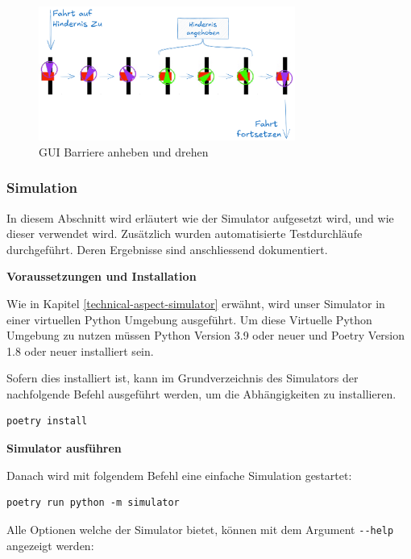 \begin{figure}[H]
\centering
\includegraphics[width=0.75\textwidth]{assets/informatik-prototyp/simulator/sim-ui-barrier-flow.png}
\caption{GUI Barriere anheben und drehen}
\label{fig:sim-gui-barrier-flow}
\end{figure}



\subsubsection{Simulation}

In diesem Abschnitt wird erläutert wie der Simulator aufgesetzt wird, und wie dieser verwendet wird. Zusätzlich wurden automatisierte Testdurchläufe durchgeführt. Deren Ergebnisse sind anschliessend dokumentiert.

\textbf{Voraussetzungen und Installation}

Wie in Kapitel \ref{technical-aspect-simulator} erwähnt, wird unser Simulator in einer virtuellen Python Umgebung ausgeführt. Um diese Virtuelle Python Umgebung zu nutzen müssen Python Version 3.9 oder neuer und Poetry Version 1.8 oder neuer installiert sein.

Sofern dies installiert ist, kann im Grundverzeichnis des Simulators der nachfolgende Befehl ausgeführt werden, um die Abhängigkeiten zu installieren.

\begin{verbatim}
poetry install
\end{verbatim}

\textbf{Simulator ausführen}

Danach wird mit folgendem Befehl eine einfache Simulation gestartet:

\begin{verbatim}
poetry run python -m simulator
\end{verbatim}

Alle Optionen welche der Simulator bietet, können mit dem Argument \verb|--help| angezeigt werden:

